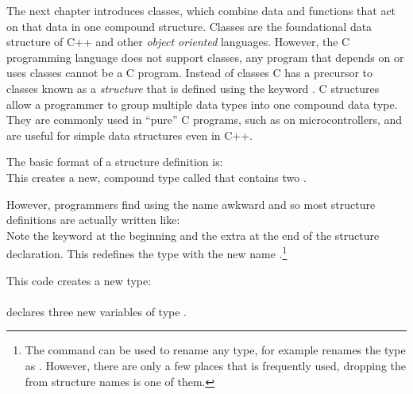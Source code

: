 

The next chapter introduces classes, which combine data and functions that act on that data in one compound structure.  Classes are the foundational data structure of C++ and other \emph{object oriented} languages.
However, the C programming language does not support classes, any program that depends on or uses classes cannot be a C program.  
Instead of classes C has a precursor to classes known as a \emph{structure} that is defined using the keyword .  C structures allow a programmer to group multiple data types into one compound data type.  They are commonly used in ``pure'' C programs, such as on microcontrollers, and are useful for simple data structures even in C++.

The basic format of a structure definition is:\\
This creates a new, compound type called  that contains two .

However, programmers find using the name  awkward and so most structure definitions are actually written like:\\
Note the keyword  at the beginning and the extra  at the end of the structure declaration.  This redefines the type  with the new name .\footnote{The  command can be used to rename any type, for example  renames the type  as .  However, there are only a few places that  is frequently used, dropping the  from structure names is one of them.}

This code creates a new  type:\\
\\
declares three new variables of type .

